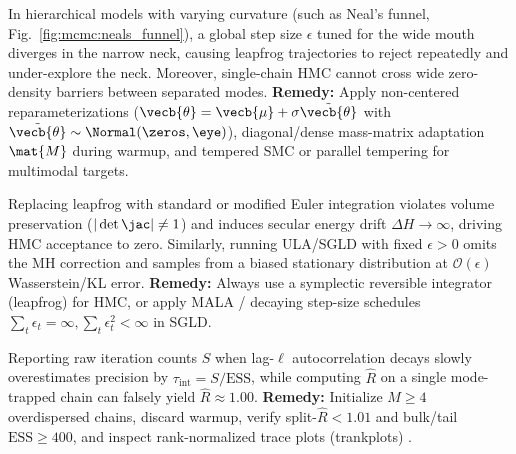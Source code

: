 \documentclass[../../../../master.tex]{subfiles}
\begin{document}
\begin{pitfall}
In hierarchical models with varying curvature (such as Neal's funnel, Fig.~\ref{fig:mcmc:neals_funnel}), a global step size $\epsilon$ tuned for the wide mouth diverges in the narrow neck, causing leapfrog trajectories to reject repeatedly and under-explore the neck. Moreover, single-chain HMC cannot cross wide zero-density barriers between separated modes. \textbf{Remedy:} Apply non-centered reparameterizations ($\vecb{\theta} = \vecb{\mu} + \sigma\tilde{\vecb{\theta}}$ with $\tilde{\vecb{\theta}} \sim \Normal(\zeros, \eye)$), diagonal/dense mass-matrix adaptation $\mat{M}$ during warmup, and tempered SMC or parallel tempering for multimodal targets.
\end{pitfall}

\begin{pitfall}
Replacing leapfrog with standard or modified Euler integration violates volume preservation ($|\det \jac| \neq 1$) and induces secular energy drift $\Delta H \to \infty$, driving HMC acceptance to zero. Similarly, running ULA/SGLD with fixed $\epsilon > 0$ omits the MH correction and samples from a biased stationary distribution at $\mathcal{O}(\epsilon)$ Wasserstein/KL error. \textbf{Remedy:} Always use a symplectic reversible integrator (leapfrog) for HMC, or apply MALA / decaying step-size schedules $\sum_t \epsilon_t = \infty, \sum_t \epsilon_t^2 < \infty$ in SGLD.
\end{pitfall}

\begin{pitfall}
Reporting raw iteration counts $S$ when lag-$\ell$ autocorrelation decays slowly overestimates precision by $\tau_{\mathrm{int}} = S/\mathrm{ESS}$, while computing $\hat{R}$ on a single mode-trapped chain can falsely yield $\hat{R} \approx 1.00$. \textbf{Remedy:} Initialize $M \ge 4$ overdispersed chains, discard warmup, verify split-$\hat{R} < 1.01$ and bulk/tail $\mathrm{ESS} \ge 400$, and inspect rank-normalized trace plots (trankplots) .
\end{pitfall}
\end{document}
